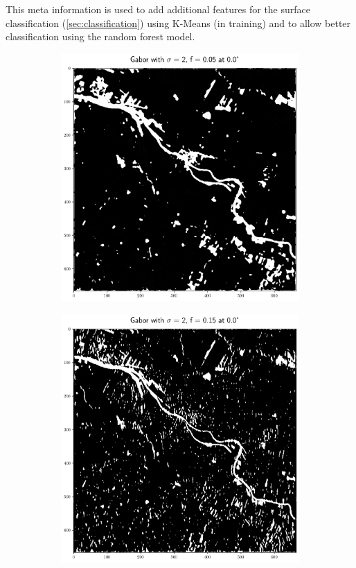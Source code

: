 \documentclass[12pt,a4paper, english]{article}
\begin{document}
    This meta information is used to add additional features for the surface classification (\cref{sec:classification}) using K-Means (in training) and to allow better classification using the random forest model.
%
    \begin{figure}[!htbp]
       \centering
     \begin{subfigure}[b]{0.45\textwidth}
         \centering
         \includegraphics[width=\textwidth]{img/Features_2_005_0.png}
         \label{fig:feat01}
     \end{subfigure}
     \hfill
     \begin{subfigure}[b]{0.45\textwidth}
         \centering
         \includegraphics[width=\textwidth]{img/Features_2_015_0.png}

\end{subfigure}
\end{figure}
\end{document}

